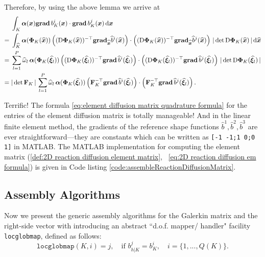 	Therefore, by using the above lemma we arrive at
	\begin{align}
		&\int_{K}\bm{\alpha}(\bx)\grad b_K^i(\bx)\cdot\grad b_K^j(\bx)\,\dx
		\nonumber \\
		=\;&\int_{\widehat{K}}
		\bm{\alpha}(\bm{\Phi}_K(\widehat{\bx}))
		\left((\mathrm{D}\bm{\Phi}_K(\widehat{\bx}))^{-\top}
		\mathbf{grad}_{\widehat{\bx}}\widehat{b}^i(\widehat{\bx})\right)\cdot 
		\left((\mathrm{D}\bm{\Phi}_K(\widehat{\bx}))^{-\top}
		\mathbf{grad}_{\widehat{\bx}}\widehat{b}^j(\widehat{\bx})\right)\,
		|\,\mathrm{det}\,\mathrm{D}\bm{\Phi}_K(\widehat{\bx})\,|\,
		\rd\widehat{\bx} \nonumber \\	
		=\;&\sum_{l=1}^{P}\widehat{\omega}_l\,
		\bm{\alpha}(\bm{\Phi}_K(\widehat{\bm{\xi}}_l))
		\left((\mathrm{D}\bm{\Phi}_K(\widehat{\bm{\xi}}_l))^{-\top}
		\grad\widehat{b}^i(\widehat{\bm{\xi}}_l)\right)\cdot 
		\left((\mathrm{D}\bm{\Phi}_K(\widehat{\bm{\xi}_l}))^{-\top}
		\grad\widehat{b}^j(\widehat{\bm{\xi}}_l)\right)\,
		|\,\mathrm{det}\,\mathrm{D}\bm{\Phi}_K(\widehat{\bm{\xi}}_l)\,|\\
		=\;&|\,\mathrm{det}\,\mathbf{F}_K\,|\,
		\sum_{l=1}^{P}\widehat{\omega}_l\,
		\bm{\alpha}(\bm{\Phi}_K(\widehat{\bm{\xi}}_l))
		\left(\mathbf{F}_K^{-\top}
		\grad\widehat{b}^i(\widehat{\bm{\xi}}_l)\right)\cdot 
		\left(\mathbf{F}_K^{-\top}
		\grad\widehat{b}^j(\widehat{\bm{\xi}}_l)\right).%
		\label{eq:element diffusion matrix quadrature formula}
	\end{align}
	
	Terrific! The formula 
	\eqref{eq:element diffusion matrix quadrature formula} 
	for the entries of the element diffusion matrix is totally
	manageable! And in the linear finite element method, the gradients of
	the reference shape functions $\widehat{b}^1,\widehat{b}^2,\widehat{b}^3$
	are ever straightforward---they are constants which can be written as
	\texttt{[-1 -1;1 0;0 1]} in MATLAB. The MATLAB implementation for computing 
	the element matrix (\ref{def:2D reaction diffusion element matrix},~%
	\ref{eq:2D reaction diffusion em formula}) is given in Code listing 
	\ref{code:assembleReactionDiffusionMatrix}.	
	
	\subsection{Assembly Algorithms}
	Now we present the generic assembly algorithms for the Galerkin matrix
	and the right-side vector with introducing an abstract ``d.o.f. mapper/%
	handler" facility \texttt{locglobmap}, defined as follows:
	\[\texttt{locglobmap}(K,i) = j,\quad \textrm{if } b_{h|K}^j = b_K^i,
		\quad i=\{1,...,Q(K)\}.\]
	

